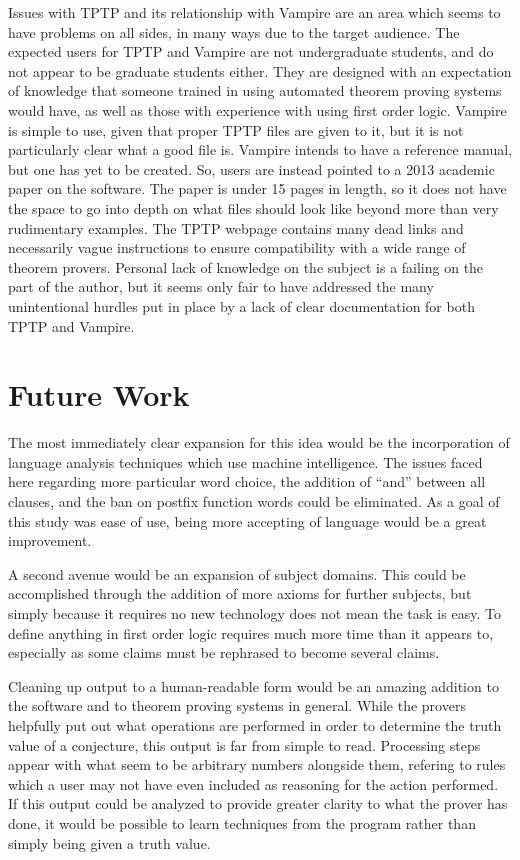 Issues with TPTP and its relationship with Vampire are an area which seems to have problems on all sides, in many ways due to the target audience. The expected users for TPTP and Vampire are not undergraduate students, and do not appear to be graduate students either. They are designed with an expectation of knowledge that someone trained in using automated theorem proving systems would have, as well as those with experience with using first order logic. Vampire is simple to use, given that proper TPTP files are given to it, but it is not particularly clear what a good file is. Vampire intends to have a reference manual, but one has yet to be created. So, users are instead pointed to a 2013 academic paper on the software. The paper is under 15 pages in length, so it does not have the space to go into depth on what files should look like beyond more than very rudimentary examples. The TPTP webpage contains many dead links and necessarily vague instructions to ensure compatibility with a wide range of theorem provers. Personal lack of knowledge on the subject is a failing on the part of the author, but it seems only fair to have addressed the many unintentional hurdles put in place by a lack of clear documentation for both TPTP and Vampire.

\section{Future Work}

The most immediately clear expansion for this idea would be the incorporation of language analysis techniques which use machine intelligence. The issues faced here regarding more particular word choice, the addition of ``and'' between all clauses, and the ban on postfix function words could be eliminated. As a goal of this study was ease of use, being more accepting of language would be a great improvement.

A second avenue would be an expansion of subject domains. This could be accomplished through the addition of more axioms for further subjects, but simply because it requires no new technology does not mean the task is easy. To define anything in first order logic requires much more time than it appears to, especially as some claims must be rephrased to become several claims.

Cleaning up output to a human-readable form would be an amazing addition to the software and to theorem proving systems in general. While the provers helpfully put out what operations are performed in order to determine the truth value of a conjecture, this output is far from simple to read. Processing steps appear with what seem to be arbitrary numbers alongside them, refering to rules which a user may not have even included as reasoning for the action performed. If this output could be analyzed to provide greater clarity to what the prover has done, it would be possible to learn techniques from the program rather than simply being given a truth value.

